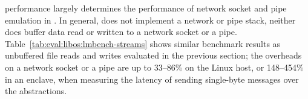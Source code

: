 \label{sec:eval:libos:streams}


\begin{table}[t!b!]

\caption{Network socket and pipe performance based on \lmbench{}. Comparison is among (1) native Linux processes; (2) \graphene{} on Linux host, both without and with \seccomp{} filter ({\bf +SC}) and reference monitor ({\bf +RM}); (3) \graphenesgx{}.
System call latency is in microseconds, and lower is better.
System call bandwidth is in megabytes per second, and higher is better. 
Overheads are relative to Linux; negative overheads indicate improvement.} 
\label{tab:eval:libos:lmbench-streams}
\end{table}


\Thehostabi{} performance
largely determines
the performance of network socket and pipe emulation
in \thelibos{}.
In general, \thelibos{} does not implement a network or pipe stack,
neither does \thelibos{}
buffer data read or written to a network socket or a pipe.
Table~\ref{tab:eval:libos:lmbench-streams} shows similar benchmark results as
unbuffered file reads and writes evaluated in the previous section;
the overheads on a network socket or a pipe are up to 33--86\% on the Linux host,
or 148--454\% in an \sgx{} enclave,
when measuring the latency of sending single-byte messages
over the abstractions.
 
